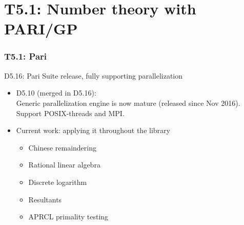 \documentclass{beamer}
\begin{document}
\section{T5.1: Number theory with PARI/GP}
\begin{frame}
  \frametitle{T5.1: Pari}
  \begin{block} {D5.16: Pari Suite release, fully supporting parallelization}
    \begin{itemize}
    \item D5.10 (merged in D5.16):\\ Generic parallelization engine is now mature
      (released since Nov 2016). Support POSIX-threads and MPI.
    \item Current work: applying it throughout the library
      \begin{itemize}
      \item Chinese remaindering
      \item Rational linear algebra
      \item Discrete logarithm
      \item Resultants
      \item APRCL primality testing
      \end{itemize}
      
    \end{itemize}
  \end{block}
\end{frame}


\end{document}
